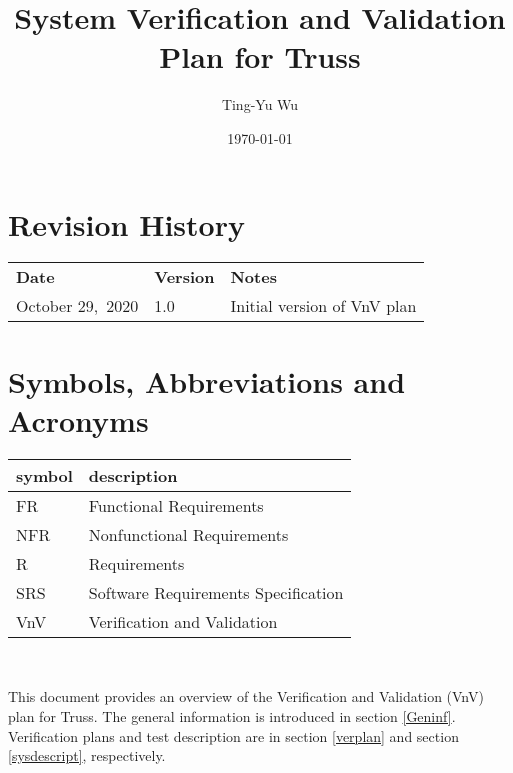 \documentclass[12pt, titlepage]{article}
\begin{document}
\title{System Verification and Validation Plan for Truss} 
\author{Ting-Yu Wu}
\date{\today}
	
\maketitle


\section{Revision History}

\begin{tabularx}{\textwidth}{p{3cm}p{2cm}X}
\toprule {\bf Date} & {\bf Version} & {\bf Notes}\\
October 29,~2020 & 1.0 & Initial version of VnV plan\\
\bottomrule
\end{tabularx}

\newpage

\tableofcontents

\listoftables

\listoffigures

\newpage

\section{Symbols, Abbreviations and Acronyms}

\renewcommand{\arraystretch}{1.2}
\begin{tabular}{l l} 
  \toprule		
  \textbf{symbol} & \textbf{description}\\
  \midrule 
  FR & Functional Requirements\\
  NFR & Nonfunctional Requirements\\
  R & Requirements\\
  SRS & Software Requirements Specification\\
  VnV & Verification and Validation\\
  \bottomrule
\end{tabular}\\


\newpage


This document provides an overview of the Verification and Validation (VnV) 
plan for Truss. The general information is introduced in section \ref{Geninf}. 
Verification plans and test description are in section \ref{verplan} and 
section \ref{sysdescript}, respectively.
\end{document}
